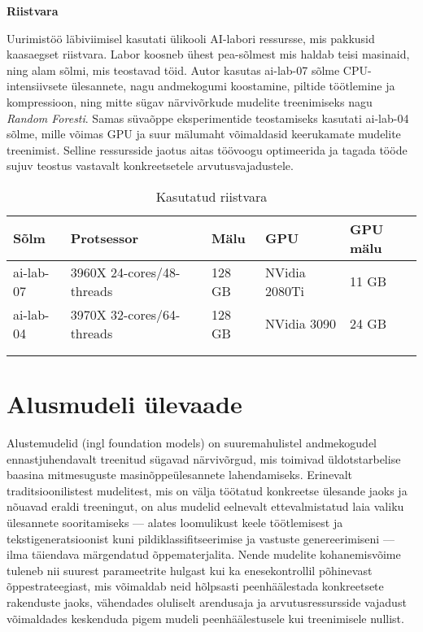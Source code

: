 \textbf{Riistvara}\nopagebreak[4]

Uurimistöö läbiviimisel kasutati ülikooli AI-labori ressursse, mis pakkusid kaasaegset riistvara. Labor koosneb ühest pea-sõlmest mis haldab teisi masinaid, ning alam sõlmi, mis teostavad töid. Autor kasutas ai-lab-07 sõlme CPU-intensiivsete ülesannete, nagu andmekogumi koostamine, piltide töötlemine ja kompressioon, ning mitte sügav närvivõrkude mudelite treenimiseks nagu \textit{Random Foresti}. Samas süvaõppe eksperimentide teostamiseks kasutati ai-lab-04 sõlme, mille võimas GPU ja suur mälumaht võimaldasid keerukamate mudelite treenimist. Selline ressursside jaotus aitas töövoogu optimeerida ja tagada tööde sujuv teostus vastavalt konkreetsetele arvutusvajadustele.
\begin{longtable}{lllll}
    \hline
    Sõlm & Protsessor & Mälu & GPU & GPU mälu                         \\ 
    \hline
    ai-lab-07 & 3960X 24-cores/48-threads & 128 GB & NVidia 2080Ti & 11 GB    \\
    ai-lab-04 & 3970X 32-cores/64-threads & 128 GB & NVidia 3090 & 24 GB      \\
    &              &                    &                              \\ \hline
    \caption{Kasutatud riistvara}
    \label{tab:hardwareused}
\end{longtable}



\section{Alusmudeli ülevaade}
Alustemudelid (ingl foundation models) on suuremahulistel andmekogudel
ennastjuhendavalt treenitud sügavad närvivõrgud, mis toimivad üldotstarbelise
baasina mitmesuguste masinõppeülesannete lahendamiseks. Erinevalt
traditsioonilistest mudelitest, mis on välja töötatud konkreetse ülesande jaoks
ja nõuavad eraldi treeningut, on alus mudelid eelnevalt ettevalmistatud laia
valiku ülesannete sooritamiseks --- alates loomulikust keele töötlemisest ja
tekstigeneratsioonist kuni pildiklassifitseerimise ja vastuste genereerimiseni
--- ilma täiendava märgendatud õppematerjalita. Nende mudelite
kohanemisvõime tuleneb nii suurest parameetrite hulgast kui ka enesekontrollil
põhinevast õppestrateegiast, mis võimaldab neid hõlpsasti peenhäälestada
konkreetsete rakenduste jaoks, vähendades oluliselt arendusaja ja
arvutusressursside vajadust võimaldades keskenduda pigem mudeli peenhäälestusele kui treenimisele nullist. 
\cite{WhatAreFoundation}


